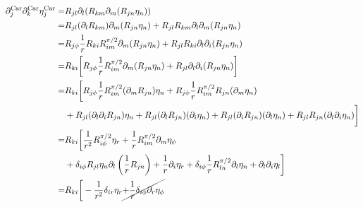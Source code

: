 \documentclass[aps,prl,preprint]{revtex4-2}
\begin{document}
\begin{align}
    \partial_j^\text{Car}\partial_k^\text{Car}\eta_j^\text{Car}= & R_{jl}\partial_l(R_{km}\partial_m(R_{jn}\eta_n))                                                             \\
    =                                                            & R_{jl}(\partial_lR_{km})\partial_m(R_{jn}\eta_n) + R_{jl}R_{km}\partial_l\partial_m(R_{jn}\eta_n)            \\
    =                                                            & R_{j\phi}\frac{1}{r}R_{ki}R^{\pi/2}_{im}\partial_m(R_{jn}\eta_n)
    + R_{jl}R_{ki}\partial_l\partial_i(R_{jn}\eta_n)                                                                                                                            \\
    =                                                            & R_{ki}\bigg[R_{j\phi}\frac{1}{r}R^{\pi/2}_{im}\partial_m(R_{jn}\eta_n)
    + R_{jl}\partial_l\partial_i(R_{jn}\eta_n)\bigg]                                                                                                                            \\
    =                                                            & R_{ki}\bigg[R_{j\phi}\frac{1}{r}R^{\pi/2}_{im}(\partial_mR_{jn})\eta_n
    +R_{j\phi}\frac{1}{r}R^{\pi/2}_{im}R_{jn}(\partial_m\eta_n)                                                                                                                 \\
                                                                 & +R_{jl}(\partial_l\partial_iR_{jn})\eta_n+R_{jl}(\partial_lR_{jn})(\partial_i\eta_n)
    +R_{jl}(\partial_iR_{jn})(\partial_l\eta_n)+R_{jl}R_{jn}(\partial_l\partial_i\eta_n)\bigg]\nonumber                                                                         \\
    =                                                            & R_{ki}\bigg[\frac{1}{r^2}R^{\pi/2}_{i\phi}\eta_r+\frac{1}{r}R^{\pi/2}_{im}\partial_m\eta_\phi\nonumber       \\
                                                                 & +\delta_{i\phi}R_{jl}\eta_n\partial_l\left(\frac{1}{r}R_{jn}\right) + \frac{1}{r}\partial_i\eta_r
    +\delta_{i\phi}\frac{1}{r}R^{\pi/2}_{ln}\partial_l\eta_n + \partial_l\partial_i\eta_l\bigg]\nonumber                                                                        \\
    =                                                            & R_{ki}\bigg[-\frac{1}{r^2}\delta_{ir}\eta_r \cancel{+ \frac{1}{r}\delta_{i\phi}\partial_r\eta_\phi}

\end{align}
\end{document}
